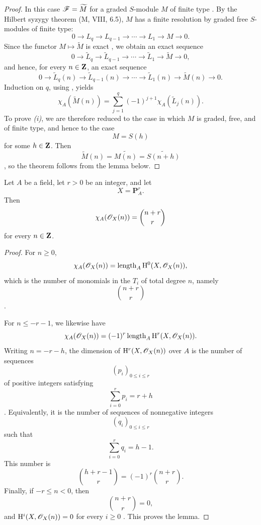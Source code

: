 \begin{proof}
In this case $\mathscr{F}=\widetilde{M}$ for a graded $S$-module $M$ of finite type .
By the Hilbert syzygy theorem (M, VIII, 6.5), $M$ has a finite resolution by graded free $S$-modules of finite type:
\[
  0\longrightarrow L_q
  \longrightarrow L_{q-1}
  \longrightarrow\cdots
  \longrightarrow L_1
  \longrightarrow M
  \longrightarrow0.
\]
Since the functor $M\mapsto\widetilde{M}$ is exact , we obtain an exact sequence
\[
  0\longrightarrow\widetilde{L}_q
  \longrightarrow\widetilde{L}_{q-1}
  \longrightarrow\cdots
  \longrightarrow\widetilde{L}_1
  \longrightarrow\widetilde{M}
  \longrightarrow0,
\]
and hence, for every $n\in\mathbf{Z}$, an exact sequence
\[
  0\longrightarrow\widetilde{L}_q(n)
  \longrightarrow\widetilde{L}_{q-1}(n)
  \longrightarrow\cdots
  \longrightarrow\widetilde{L}_1(n)
  \longrightarrow\widetilde{M}(n)
  \longrightarrow0.
\]
Induction on $q$, using , yields
\[
  \chi_A(\widetilde{M}(n))
  =
  \sum_{j=1}^{q}
  (-1)^{j+1}\chi_A(\widetilde{L}_j(n)).
\]
To prove \emph{(i)}, we are therefore reduced to the case in which $M$ is graded, free, and of finite type, and hence to the case
\[
  M=S(h)
\]
for some $h\in\mathbf{Z}$.
Then
\[
  \widetilde{M}(n)
  =
  \widetilde{M(n)}
  =
  \widetilde{S(n+h)}
\]
, so the theorem follows from the lemma below.
\end{proof}

\begin{lemma}[2.5.3.1]
\label{III.2.5.3.1}
Let $A$ be a field, let $r>0$ be an integer, and let
\[
  X=\mathbf{P}_A^r.
\]
Then
\[
  \chi_A(\mathscr{O}_X(n))
  =
  \binom{n+r}{r}
\]
for every $n\in\mathbf{Z}$.
\end{lemma}

\begin{proof}
For $n\geq0$,
\[
  \chi_A(\mathscr{O}_X(n))
  =
  \operatorname{length}_A\mathrm{H}^0(X,\mathscr{O}_X(n)),
\]
which is the number of monomials in the $T_i$ of total degree $n$, namely
\[
  \binom{n+r}{r}
\]
.

For $n\leq-r-1$, we likewise have
\[
  \chi_A(\mathscr{O}_X(n))
  =
  (-1)^r\operatorname{length}_A\mathrm{H}^r(X,\mathscr{O}_X(n)).
\]
Writing $n=-r-h$, the dimension of $\mathrm{H}^r(X,\mathscr{O}_X(n))$ over $A$ is the number of sequences
\[
  (p_i)_{0\leq i\leq r}
\]
of positive integers satisfying
\[
  \sum_{i=0}^{r}p_i=r+h
\]
.
Equivalently, it is the number of sequences of nonnegative integers
\[
  (q_i)_{0\leq i\leq r}
\]
such that
\[
  \sum_{i=0}^{r}q_i=h-1.
\]
This number is
\[
  \binom{h+r-1}{r}
  =
  (-1)^r\binom{n+r}{r}.
\]
Finally, if $-r\leq n<0$, then
\[
  \binom{n+r}{r}=0,
\]
and $\mathrm{H}^i(X,\mathscr{O}_X(n))=0$ for every $i\geq0$ .
This proves the lemma.
\end{proof}

